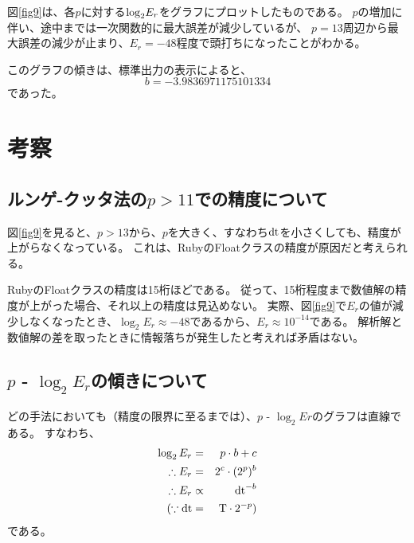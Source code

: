 \documentclass[11pt]{jsarticle}
\newcommand{\fr}[1]{図\ref{#1}}
\newcommand{\dtn}{{\rm dt}}
\begin{document}
            \fr{fig9}は、各$p$に対する${\rm log}_2E_r$をグラフにプロットしたものである。
            $p$の増加に伴い、途中までは一次関数的に最大誤差が減少しているが、
            $p = 13$周辺から最大誤差の減少が止まり、$E_r = -48$程度で頭打ちになったことがわかる。

            このグラフの傾きは、標準出力の表示によると、
            \[
                b = -3.9836971175101334
            \]
            であった。

    \section{考察}

        \subsection{ルンゲ-クッタ法の$p > 11$での精度について}
            \fr{fig9}を見ると、$p > 13$から、$p$を大きく、すなわち$\dtn$を小さくしても、精度が上がらなくなっている。
            これは、RubyのFloatクラスの精度が原因だと考えられる。

            RubyのFloatクラスの精度は15桁ほどである。
            従って、15桁程度まで数値解の精度が上がった場合、それ以上の精度は見込めない。 
            実際、\fr{fig9}で$E_r$の値が減少しなくなったとき、$\log_2 E_r \approx -48$であるから、$E_r \approx 10^{-14}$である。
            解析解と数値解の差を取ったときに情報落ちが発生したと考えれば矛盾はない。

        \subsection{$p$ - $\log_2 E_r$の傾きについて}
            どの手法においても（精度の限界に至るまでは）、$p$ - $\log_2 Er$のグラフは直線である。
            すなわち、
            \begin{eqnarray*}
                \log_2 E_r & = & p \cdot b + c \\
                \therefore E_r & = & 2^c \cdot (2^p)^b \\
                \therefore E_r & \propto & \dtn^{-b} \\
                (\because \dtn & = & {\rm T} \cdot 2^{-p} )
            \end{eqnarray*}
            である。
\end{document}
